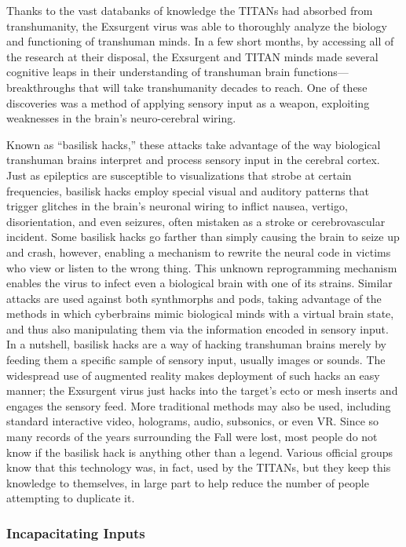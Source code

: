 Thanks to the vast databanks of knowledge the TITANs 
had absorbed from transhumanity, the Exsurgent virus 
was able to thoroughly analyze the biology and functioning
of transhuman minds. In a few short months, by
accessing all of the research at their disposal, the Exsurgent
and TITAN minds made several cognitive leaps in
their understanding of transhuman brain functions—
breakthroughs that will take transhumanity decades to 
reach. One of these discoveries was a method of applying
sensory input as a weapon, exploiting weaknesses
in the brain's neuro-cerebral wiring.

Known as ``basilisk hacks,'' these attacks take 
advantage of the way biological transhuman brains 
interpret and process sensory input in the cerebral 
cortex. Just as epileptics are susceptible to visualizations
that strobe at certain frequencies, basilisk hacks
employ special visual and auditory patterns that trigger
glitches in the brain's neuronal wiring to inflict
nausea, vertigo, disorientation, and even seizures, 
often mistaken as a stroke or cerebrovascular incident. 
Some basilisk hacks go farther than simply causing 
the brain to seize up and crash, however, enabling a 
mechanism to rewrite the neural code in victims who 
view or listen to the wrong thing. This unknown reprogramming
mechanism enables the virus to infect
even a biological brain with one of its strains. Similar 
attacks are used against both synthmorphs and pods, 
taking advantage of the methods in which cyberbrains 
mimic biological minds with a virtual brain state, and 
thus also manipulating them via the information encoded
in sensory input.
In a nutshell, basilisk hacks are a way of hacking 
transhuman brains merely by feeding them a specific 
sample of sensory input, usually images or sounds. 
The widespread use of augmented reality makes 
deployment of such hacks an easy manner; the Exsurgent
virus just hacks into the target's ecto or mesh
inserts and engages the sensory feed. More traditional 
methods may also be used, including standard interactive
video, holograms, audio, subsonics, or even VR.
Since so many records of the years surrounding 
the Fall were lost, most people do not know if the 
basilisk hack is anything other than a legend. Various 
official groups know that this technology was, in fact, 
used by the TITANs, but they keep this knowledge to 
themselves, in large part to help reduce the number of 
people attempting to duplicate it. 

\subsubsection{Incapacitating Inputs}

